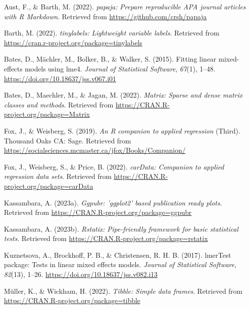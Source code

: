 \documentclass[
  man]{apa6}
\newlength{\cslhangindent}
\newlength{\cslentryspacingunit} %
\newenvironment{CSLReferences}[2] %
 {%
  \setlength{\parindent}{0pt}
  \ifodd #1
  \let\oldpar\par
  \def\par{\hangindent=\cslhangindent\oldpar}
  \fi
  \setlength{\parskip}{#2\cslentryspacingunit}
 }%
 {}
\begin{document}
\begin{CSLReferences}{1}{0}
\leavevmode{}%
Aust, F., \& Barth, M. (2022). \emph{{papaja}: {Prepare} reproducible {APA} journal articles with {R Markdown}}. Retrieved from \url{https://github.com/crsh/papaja}

\leavevmode{}%
Barth, M. (2022). \emph{{tinylabels}: Lightweight variable labels}. Retrieved from \url{https://cran.r-project.org/package=tinylabels}

\leavevmode{}%
Bates, D., Mächler, M., Bolker, B., \& Walker, S. (2015). Fitting linear mixed-effects models using {lme4}. \emph{Journal of Statistical Software}, \emph{67}(1), 1--48. \url{https://doi.org/10.18637/jss.v067.i01}

\leavevmode{}%
Bates, D., Maechler, M., \& Jagan, M. (2022). \emph{Matrix: Sparse and dense matrix classes and methods}. Retrieved from \url{https://CRAN.R-project.org/package=Matrix}

\leavevmode{}%
Fox, J., \& Weisberg, S. (2019). \emph{An {R} companion to applied regression} (Third). Thousand Oaks {CA}: Sage. Retrieved from \url{https://socialsciences.mcmaster.ca/jfox/Books/Companion/}

\leavevmode{}%
Fox, J., Weisberg, S., \& Price, B. (2022). \emph{carData: Companion to applied regression data sets}. Retrieved from \url{https://CRAN.R-project.org/package=carData}

\leavevmode{}%
Kassambara, A. (2023a). \emph{Ggpubr: 'ggplot2' based publication ready plots}. Retrieved from \url{https://CRAN.R-project.org/package=ggpubr}

\leavevmode{}%
Kassambara, A. (2023b). \emph{Rstatix: Pipe-friendly framework for basic statistical tests}. Retrieved from \url{https://CRAN.R-project.org/package=rstatix}

\leavevmode{}%
Kuznetsova, A., Brockhoff, P. B., \& Christensen, R. H. B. (2017). {lmerTest} package: Tests in linear mixed effects models. \emph{Journal of Statistical Software}, \emph{82}(13), 1--26. \url{https://doi.org/10.18637/jss.v082.i13}

\leavevmode{}%
Müller, K., \& Wickham, H. (2022). \emph{Tibble: Simple data frames}. Retrieved from \url{https://CRAN.R-project.org/package=tibble}


\end{CSLReferences}
\end{document}
